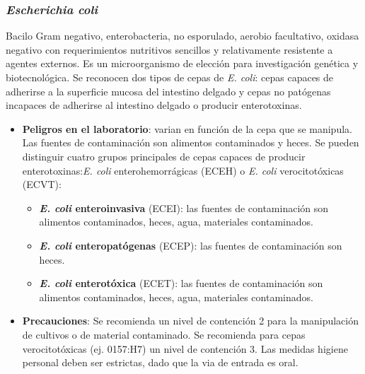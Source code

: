 \subsubsection{\textit{Escherichia coli}}
Bacilo Gram negativo, enterobacteria, no esporulado, aerobio facultativo, oxidasa negativo con requerimientos nutritivos sencillos y relativamente resistente a agentes externos. Es un microorganismo de elección para investigación genética y biotecnológica. Se reconocen dos tipos de cepas de \textit{E. coli}: cepas capaces de adherirse a la superficie mucosa del intestino delgado y cepas no patógenas incapaces de adherirse al intestino delgado o producir enterotoxinas.
\begin{itemize}[itemsep=0pt,parsep=0pt,topsep=0pt,partopsep=0pt]
    \item\textbf{Peligros en el laboratorio}: varian en función de la cepa que se manipula. Las fuentes de contaminación son alimentos contaminados y heces. Se pueden distinguir cuatro grupos principales de cepas capaces de producir enterotoxinas:\textit{E. coli} enterohemorrágicas (ECEH) o \textit{E. coli} verocitotóxicas (ECVT):
    \begin{itemize}[itemsep=0pt,parsep=0pt,topsep=0pt,partopsep=0pt]
        \item \textbf{\textit{E. coli} enteroinvasiva} (ECEI): las fuentes de contaminación son alimentos contaminados, heces, agua, materiales contaminados.
        \item \textbf{\textit{E. coli} enteropatógenas} (ECEP): las fuentes de contaminación son heces.
        \item \textbf{\textit{E. coli} enterotóxica} (ECET): las fuentes de contaminación son alimentos contaminados, heces, agua, materiales contaminados.
    \end{itemize}
    \item\textbf{Precauciones}: Se recomienda un nivel de contención 2 para la manipulación de cultivos o de material contaminado. Se recomienda para cepas verocitotóxicas (ej. 0157:H7) un nivel de contención 3. Las medidas higiene personal deben ser estrictas, dado que la via de entrada es oral.
\end{itemize}
